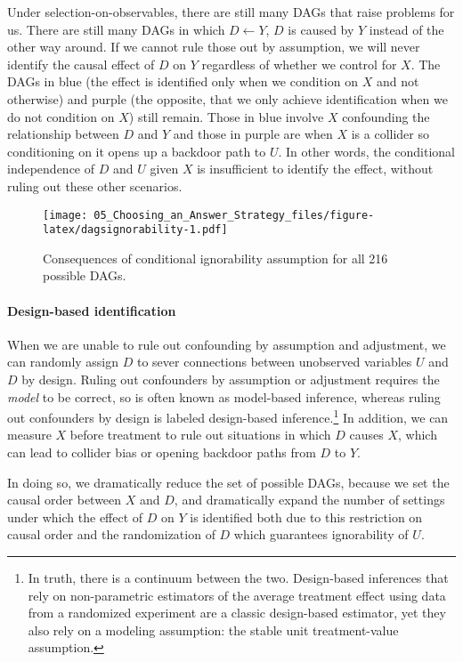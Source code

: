 \documentclass[
]{article}
\begin{document}
Under selection-on-observables, there are still many DAGs that raise
problems for us. There are still many DAGs in which \(D\leftarrow Y\),
\(D\) is caused by \(Y\) instead of the other way around. If we cannot
rule those out by assumption, we will never identify the causal effect
of \(D\) on \(Y\) regardless of whether we control for \(X\). The DAGs
in blue (the effect is identified only when we condition on \(X\) and
not otherwise) and purple (the opposite, that we only achieve
identification when we do not condition on \(X\)) still remain. Those in
blue involve \(X\) confounding the relationship between \(D\) and \(Y\)
and those in purple are when \(X\) is a collider so conditioning on it
opens up a backdoor path to \(U\). In other words, the conditional
independence of \(D\) and \(U\) given \(X\) is insufficient to identify
the effect, without ruling out these other scenarios.

\begin{figure}
\centering
\texttt{[image: 05\_Choosing\_an\_Answer\_Strategy\_files/figure-latex/dagsignorability-1.pdf]}
\caption{Consequences of conditional ignorability assumption for all 216
possible DAGs.}
\end{figure}

\hypertarget{design-based-identification}{%
\paragraph{Design-based
identification}\label{design-based-identification}}

When we are unable to rule out confounding by assumption and adjustment,
we can randomly assign \(D\) to sever connections between unobserved
variables \(U\) and \(D\) by design. Ruling out confounders by
assumption or adjustment requires the \emph{model} to be correct, so is
often known as model-based inference, whereas ruling out confounders by
design is labeled design-based inference.\footnote{In truth, there is a
  continuum between the two. Design-based inferences that rely on
  non-parametric estimators of the average treatment effect using data
  from a randomized experiment are a classic design-based estimator, yet
  they also rely on a modeling assumption: the stable unit
  treatment-value assumption.} In addition, we can measure \(X\) before
treatment to rule out situations in which \(D\) causes \(X\), which can
lead to collider bias or opening backdoor paths from \(D\) to \(Y\).

In doing so, we dramatically reduce the set of possible DAGs, because we
set the causal order between \(X\) and \(D\), and dramatically expand
the number of settings under which the effect of \(D\) on \(Y\) is
identified both due to this restriction on causal order and the
randomization of \(D\) which guarantees ignorability of \(U\).
\end{document}
